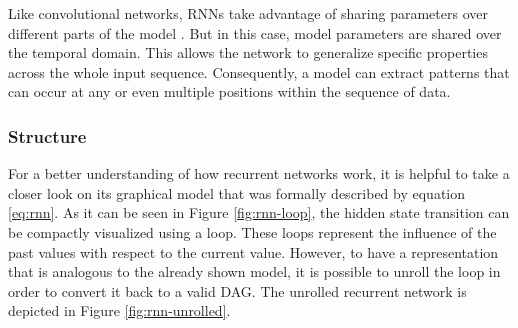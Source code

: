 Like convolutional networks, RNNs take advantage of sharing parameters over different parts of the model \parencite[p. 374]{deep_learning}. But in this case, model parameters are shared over the temporal domain. This allows the network to generalize specific properties across the whole input sequence. Consequently, a model can extract patterns that can occur at any or even multiple positions within the sequence of data.

\subsubsection{Structure}

For a better understanding of how recurrent networks work, it is helpful to take a closer look on its graphical model that was formally described by equation \ref{eq:rnn}. As it can be seen in Figure \ref{fig:rnn-loop}, the hidden state transition can be compactly visualized using a loop. These loops represent the influence of the past values with respect to the current value. However, to have a representation that is analogous to the already shown model, it is possible to unroll the loop in order to convert it back to a valid DAG. The unrolled recurrent network is depicted in Figure \ref{fig:rnn-unrolled}.


